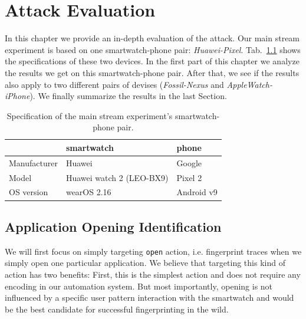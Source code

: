 \chapter{Attack Evaluation}
\label{chap:analysis_and_results}

In this chapter we provide an in-depth evaluation of the attack. Our main stream experiment is based on one smartwatch-phone pair: \textit{Huawei-Pixel}. Tab.~\ref{tab:main_watch_spec} shows the specifications of these two devices. In the first part of this chapter we analyze the results we get on this smartwatch-phone pair. After that, we see if the results also apply to two different pairs of devises (\textit{Fossil-Nexus} and \textit{AppleWatch-iPhone}). We finally summarize the results in the last Section.
\\

\begin{table}[ht]
    \caption{Specification of the main stream experiment's smartwatch-phone pair.}
    \label{tab:main_watch_spec}
\centering
{}
 \begin{tabular}{@{}lll@{}} 
 \toprule
  & smartwatch & phone \\ [0.5ex] 
 \midrule
 Manufacturer & Huawei & Google \\ 

 Model & Huawei watch 2 (LEO-BX9) & Pixel 2  \\

 OS version & wearOS 2.16 & Android v9  \\
 \bottomrule
\end{tabular}

\end{table}



\section{Application Opening Identification}
\label{sec:application opening identification}
We will first focus on simply targeting \texttt{open} action, i.e. fingerprint traces when we simply open one particular application. We believe that targeting this kind of action has two benefits: First, this is the simplest action and does not require any encoding in our automation system. But most importantly, opening is not influenced by a specific user pattern interaction with the smartwatch and would be the best candidate for successful fingerprinting in the wild.



